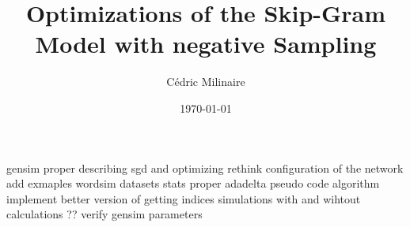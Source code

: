 \documentclass[
    numbers=noenddot,
    parskip=half-,
    fontsize=12pt,
    paper=a4,
    oneside,
    titlepage,
    bibliography=totoc,
    chapterprefix=false,
]{scrbook}
\title{Optimizations of the Skip-Gram Model with negative Sampling}
\author{Cédric Milinaire}
\date{\today}
\begin{document}
\frontmatter

%

\tableofcontents
\newpage



\newpage

%
\newpage
\thispagestyle{empty}
\cleardoublepage
\listoffigures
\newpage

\thispagestyle{empty}
\cleardoublepage
\listoftables
\newpage
\mainmatter
gensim proper 
describing sgd and optimizing 
rethink configuration of the network 
add exmaples wordsim 
datasets stats proper
adadelta 
pseudo code algorithm 
implement better version of getting indices 
simulations with and wihtout calculations ??
verify gensim parameters









%





\newpage


\backmatter

\printbibliography

%
\end{document}
